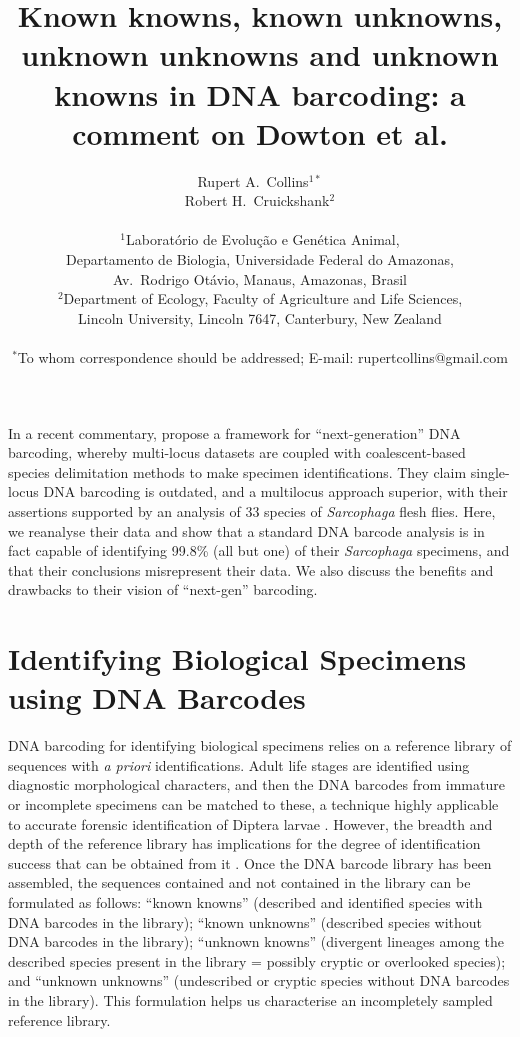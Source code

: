 \documentclass[12pt]{article}
\title{\bf Known knowns, known unknowns, unknown unknowns and unknown knowns in DNA barcoding: a comment on Dowton et al.}
\author
{Rupert A.\ Collins$^{1*}$\\
Robert H.\ Cruickshank$^{2}$\\
\\
\normalsize{$^{1}$Laborat\'orio de Evolu\c c\~ao e Gen\'etica Animal,}\\
\normalsize{Departamento de Biologia, Universidade Federal do Amazonas,}\\
\normalsize{Av.\ Rodrigo Ot\'avio, Manaus, Amazonas, Brasil}\\
\normalsize{$^{2}$Department of Ecology, Faculty of Agriculture and Life Sciences,}\\
\normalsize{Lincoln University,  Lincoln 7647,  Canterbury, New Zealand}\\
\\
\normalsize{$^\ast$To whom correspondence should be addressed; E-mail:  rupertcollins@gmail.com}
}
\date{}
\begin{document}
 
\maketitle 
\linenumbers

In a recent commentary, \citet{Dowton2014} propose a framework for ``next-generation'' DNA barcoding, whereby multi-locus datasets are coupled with coalescent-based species delimitation methods to make specimen identifications. They claim single-locus DNA barcoding is outdated, and a multilocus approach superior, with their assertions supported by an analysis of 33 species of \emph{Sarcophaga} flesh flies. Here, we reanalyse their data and show that a standard DNA barcode analysis is in fact capable of identifying 99.8\% (all but one) of their \emph{Sarcophaga} specimens, and that their conclusions misrepresent their data. We also discuss the benefits and drawbacks to their vision of ``next-gen'' barcoding.

\section*{Identifying Biological Specimens using DNA Barcodes}

DNA barcoding for identifying biological specimens relies on a reference library of sequences with \emph{a priori} identifications. Adult life stages are identified using diagnostic morphological characters, and then the DNA barcodes from immature or incomplete specimens can be matched to these, a technique highly applicable to accurate forensic identification of Diptera larvae \citep{Meiklejohn2011}. However, the breadth and depth of the reference library has implications for the degree of identification success that can be obtained from it \citep{Bergsten2012,Virgilio2012,Zhang2012b}. Once the DNA barcode library has been assembled, the sequences contained and not contained in the library can be formulated as follows: ``known knowns'' (described and identified species with DNA barcodes in the library); ``known unknowns'' (described species without DNA barcodes in the library); ``unknown knowns'' (divergent lineages among the described species present in the library = possibly cryptic or overlooked species); and ``unknown unknowns'' (undescribed or cryptic species without DNA barcodes in the library). This formulation helps us characterise an incompletely sampled reference library.
\end{document}

